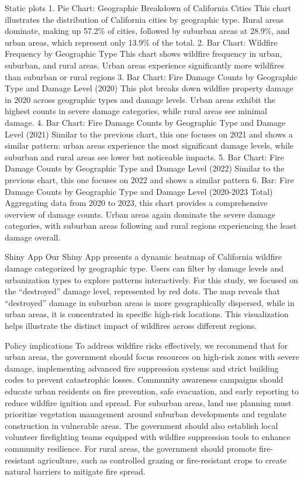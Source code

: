 \documentclass[
  letterpaper,
  DIV=11,
  numbers=noendperiod]{scrartcl}
\begin{document}
Static plots 1. Pie Chart: Geographic Breakdown of California Cities
This chart illustrates the distribution of California cities by
geographic type. Rural areas dominate, making up 57.2\% of cities,
followed by suburban areas at 28.9\%, and urban areas, which represent
only 13.9\% of the total. 2. Bar Chart: Wildfire Frequency by Geographic
Type This chart shows wildfire frequency in urban, suburban, and rural
areas. Urban areas experience significantly more wildfires than suburban
or rural regions 3. Bar Chart: Fire Damage Counts by Geographic Type and
Damage Level (2020) This plot breaks down wildfire property damage in
2020 across geographic types and damage levels. Urban areas exhibit the
highest counts in severe damage categories, while rural areas see
minimal damage. 4. Bar Chart: Fire Damage Counts by Geographic Type and
Damage Level (2021) Similar to the previous chart, this one focuses on
2021 and shows a similar pattern: urban areas experience the most
significant damage levels, while suburban and rural areas see lower but
noticeable impacts. 5. Bar Chart: Fire Damage Counts by Geographic Type
and Damage Level (2022) Similar to the previous chart, this one focuses
on 2022 and shows a similar pattern 6. Bar: Fire Damage Counts by
Geographic Type and Damage Level (2020-2023 Total) Aggregating data from
2020 to 2023, this chart provides a comprehensive overview of damage
counts. Urban areas again dominate the severe damage categories, with
suburban areas following and rural regions experiencing the least damage
overall.

Shiny App Our Shiny App presents a dynamic heatmap of California
wildfire damage categorized by geographic type. Users can filter by
damage levels and urbanization types to explore patterns interactively.
For this study, we focused on the ``destroyed'' damage level,
represented by red dots. The map reveals that ``destroyed'' damage in
suburban areas is more geographically dispersed, while in urban areas,
it is concentrated in specific high-risk locations. This visualization
helps illustrate the distinct impact of wildfires across different
regions.

Policy implications To address wildfire risks effectively, we recommend
that for urban areas, the government should focus resources on high-risk
zones with severe damage, implementing advanced fire suppression systems
and strict building codes to prevent catastrophic losses. Community
awareness campaigns should educate urban residents on fire prevention,
safe evacuation, and early reporting to reduce wildfire ignition and
spread. For suburban areas, land use planning must prioritize vegetation
management around suburban developments and regulate construction in
vulnerable areas. The government should also establish local volunteer
firefighting teams equipped with wildfire suppression tools to enhance
community resilience. For rural areas, the government should promote
fire-resistant agriculture, such as controlled grazing or fire-resistant
crops to create natural barriers to mitigate fire spread.
\end{document}

